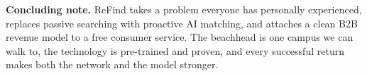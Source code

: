 \documentclass[11pt,a4paper]{article}
\begin{document}
\vspace{6pt}
\noindent\textbf{Concluding note.} ReFind takes a problem everyone has personally
experienced, replaces passive searching with proactive AI matching, and attaches a clean
B2B revenue model to a free consumer service. The beachhead is one campus we can walk to,
the technology is pre-trained and proven, and every successful return makes both the
network and the model stronger.
\end{document}
